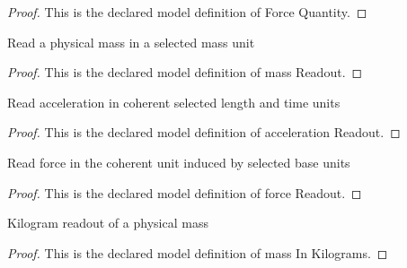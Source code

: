 \begin{proof}
  This is the declared model definition of Force Quantity.
\end{proof}
\begin{definition}
  \label{def:physics:phyx-mini-0757:phyxminiproblems-problemphyxmini0757-massreadout}
  Read a physical mass in a selected mass unit
\end{definition}
\begin{proof}
  This is the declared model definition of mass Readout.
\end{proof}
\begin{definition}
  \label{def:physics:phyx-mini-0757:phyxminiproblems-problemphyxmini0757-accelerationreadout}
  Read acceleration in coherent selected length and time units
\end{definition}
\begin{proof}
  This is the declared model definition of acceleration Readout.
\end{proof}
\begin{definition}
  \label{def:physics:phyx-mini-0757:phyxminiproblems-problemphyxmini0757-forcereadout}
  Read force in the coherent unit induced by selected base units
\end{definition}
\begin{proof}
  This is the declared model definition of force Readout.
\end{proof}
\begin{definition}
  \label{def:physics:phyx-mini-0757:phyxminiproblems-problemphyxmini0757-massinkilograms}
  Kilogram readout of a physical mass
\end{definition}
\begin{proof}
  This is the declared model definition of mass In Kilograms.
\end{proof}
